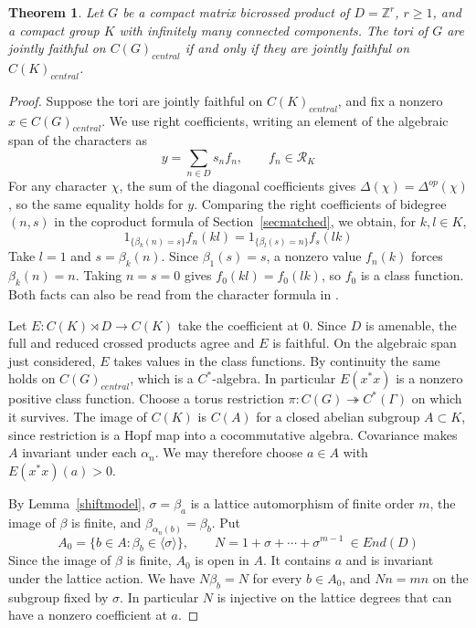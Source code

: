 \documentclass[11pt,a4paper]{article}
\newtheorem{thm}{Theorem}[section]
\theoremstyle{remark}
\begin{document}
\begin{thm}\label{bicrosscharacters}
Let $G$ be a compact matrix bicrossed product of $D=\mathbb Z^r$,
$r\ge1$, and a compact group $K$ with infinitely many connected
components. The tori of $G$ are jointly faithful on $C(G)_{central}$ if and only
if they are jointly faithful on $C(K)_{central}$.
\end{thm}
\begin{proof}
Suppose the tori are jointly faithful on $C(K)_{central}$, and fix a
nonzero $x\in C(G)_{central}$. We use right coefficients, writing an element
of the algebraic span of the characters as
\[
 y=\sum_{n\in D}s_n f_n,\qquad f_n\in\mathcal R_K
\]
For any character $\chi$, the sum of the diagonal coefficients gives
$\Delta(\chi)=\Delta^{op}(\chi)$, so the same equality holds for $y$.
Comparing the right coefficients of bidegree $(n,s)$ in the coproduct
formula of Section~\ref{secmatched}, we obtain, for $k,l\in K$,
\[
 1_{\{\beta_k(n)=s\}} f_n(kl)
   =1_{\{\beta_l(s)=n\}} f_s(lk)
\]
Take $l=1$ and $s=\beta_k(n)$. Since $\beta_1(s)=s$, a nonzero value
$f_n(k)$ forces $\beta_k(n)=n$. Taking $n=s=0$ gives $f_0(kl)=f_0(lk)$,
so $f_0$ is a class function. Both facts can also be read from the
character formula in \cite[Theorem~3.1]{fw}.

Let $E:C(K)\rtimes D\to C(K)$ take the coefficient at $0$. Since $D$
is amenable, the full and reduced crossed products agree and $E$ is
faithful. On the algebraic span just considered, $E$ takes values in
the class functions. By continuity the same holds on $C(G)_{central}$, which
is a $C^*$-algebra. In particular $E(x^*x)$ is a nonzero positive
class function. Choose a torus restriction
$\pi:C(G)\twoheadrightarrow C^*(\Gamma)$ on which it survives.
The image of $C(K)$ is $C(A)$ for a closed abelian subgroup $A\subset K$,
since restriction is a Hopf map into a cocommutative algebra.
Covariance makes $A$ invariant under each $\alpha_n$. We may therefore
choose $a\in A$ with $E(x^*x)(a)>0$.

By Lemma~\ref{shiftmodel}, $\sigma=\beta_a$ is a lattice automorphism
of finite order $m$, the image of $\beta$ is finite, and
$\beta_{\alpha_n(b)}=\beta_b$. Put
\[
 A_0=\{b\in A:\beta_b\in\langle\sigma\rangle\},\qquad
 N=1+\sigma+\cdots+\sigma^{m-1}\ \in End(D)
\]
Since the image of $\beta$ is finite, $A_0$ is open in $A$. It contains
$a$ and is invariant under
the lattice action. We have $N\beta_b=N$ for every $b\in A_0$, and
$Nn=mn$ on the subgroup fixed by $\sigma$. In particular $N$ is
injective on the lattice degrees that can have a nonzero coefficient
at $a$.


\end{proof}
\end{document}
